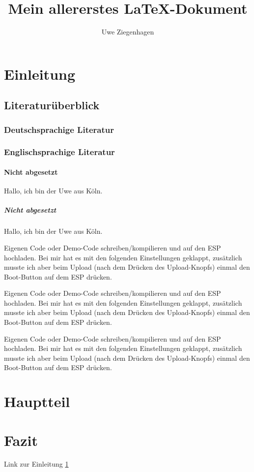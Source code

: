 \documentclass[ngerman,12pt,parskip=half]{scrartcl}
\author{Uwe Ziegenhagen}
\title{Mein allererstes \LaTeX-Dokument}
\begin{document}
\maketitle

\tableofcontents

\section{Einleitung}\label{sec:einleitung}
\subsection{Literaturüberblick}

\blindtext

\subsubsection{Deutschsprachige Literatur}

\blindtext

\subsubsection{Englischsprachige Literatur}

\blindtext

\paragraph{Nicht abgesetzt} Hallo, ich bin der Uwe aus Köln.

\subparagraph{Nicht abgesetzt} Hallo, ich bin der Uwe aus Köln.

Eigenen Code oder Demo-Code schreiben/kompilieren und auf den ESP hochladen. Bei mir hat es mit den folgenden Einstellungen geklappt, zusätzlich musste ich aber beim Upload (nach dem Drücken des Upload-Knopfs) einmal den Boot-Button auf dem ESP drücken.

Eigenen Code oder Demo-Code schreiben/kompilieren und auf den ESP hochladen. Bei mir hat es mit den folgenden Einstellungen geklappt, zusätzlich musste ich aber beim Upload (nach dem Drücken des Upload-Knopfs) einmal den Boot-Button auf dem ESP drücken.

Eigenen Code oder Demo-Code schreiben/kompilieren und auf den ESP hochladen. Bei mir hat es mit den folgenden Einstellungen geklappt, zusätzlich musste ich aber beim Upload (nach dem Drücken des Upload-Knopfs) einmal den Boot-Button auf dem ESP drücken.

\blindtext[10]

\section{Hauptteil}

\blindtext[10]

\section{Fazit}

\blindtext[10]


Link zur Einleitung \ref{sec:einleitung}
\end{document}
